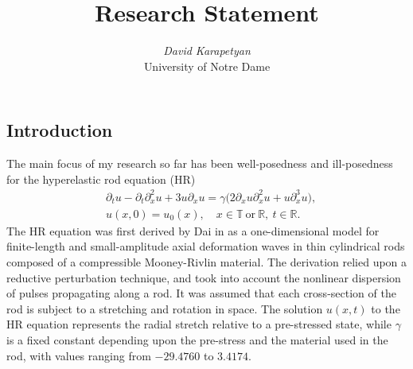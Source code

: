 \documentclass[12pt,reqno]{amsart}
\newcommand{\rr}{\mathbb{R}}
\newcommand{\ci}{\mathbb{T}}
\newcommand{\p}{\partial}
\begin{document}
\title{Research Statement} 
\author{{\it David Karapetyan}\\
    \/ University of Notre Dame}
\maketitle


\parindent0in
\parskip0.1in
%
%
%
\setcounter{section}{0}
%
%
%
%
%
%
%
%
\subsection{Introduction} 
\label{ssec:cur-res}
The main focus of my research so far has been well-posedness and ill-posedness
for the hyperelastic rod equation (HR)
\begin{align}
\label{hr}
& \p_t u
-
\p_t \p_x^2 u
+
3u\p_x u
=
\gamma \big (
2\p_x u \p_x^2 u
+
u \p_x^3 u
\big ),
\\
\label{hr-data} 
& u(x, 0) = u_0 (x),
\quad x  \in \ci \ \text{or} \ \rr, \ t \in \rr.
\end{align}
The HR equation was first derived by Dai in \cite{Dai_1998_Model-equations} as a
one-dimensional model for finite-length and small-amplitude axial deformation
waves in thin cylindrical rods composed of a compressible Mooney-Rivlin
material. The derivation relied upon a reductive perturbation technique, and
took into account the nonlinear dispersion of pulses propagating along a rod. It
was assumed that each cross-section of the rod is subject to a stretching and
rotation in space. The solution $u(x,t)$ to the HR equation represents the
radial stretch relative to a pre-stressed state, while $\gamma$ is a fixed
constant depending upon the pre-stress and the material used in the rod, with
values ranging from $- 29.4760$ to $3.4174$.
\end{document}
